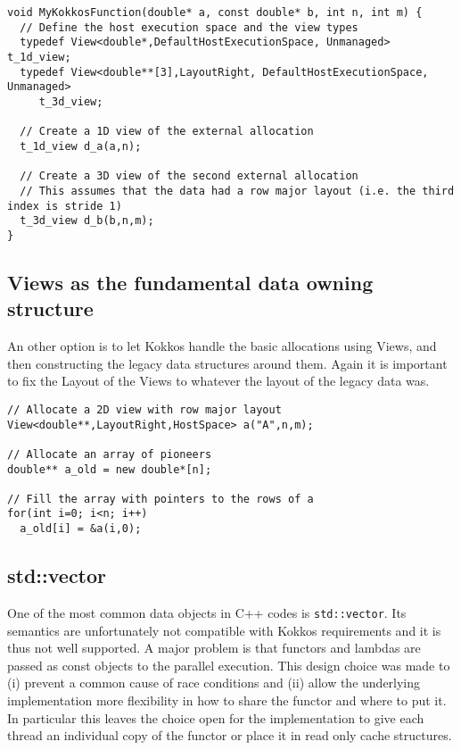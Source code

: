  \begin{lstlisting}
void MyKokkosFunction(double* a, const double* b, int n, int m) {
  // Define the host execution space and the view types
  typedef View<double*,DefaultHostExecutionSpace, Unmanaged> t_1d_view;
  typedef View<double**[3],LayoutRight, DefaultHostExecutionSpace, Unmanaged> 
     t_3d_view;
  
  // Create a 1D view of the external allocation
  t_1d_view d_a(a,n);
 
  // Create a 3D view of the second external allocation
  // This assumes that the data had a row major layout (i.e. the third index is stride 1)
  t_3d_view d_b(b,n,m);
}
\end{lstlisting}

\subsection{Views as the fundamental data owning structure}

An other option is to let Kokkos handle the basic allocations using Views, 
and then constructing the legacy data structures around them. Again it is
important to fix the Layout of the Views to whatever the layout of the legacy 
data was. 

\begin{lstlisting}
// Allocate a 2D view with row major layout
View<double**,LayoutRight,HostSpace> a("A",n,m);

// Allocate an array of pioneers
double** a_old = new double*[n];

// Fill the array with pointers to the rows of a
for(int i=0; i<n; i++)
  a_old[i] = &a(i,0);
\end{lstlisting}

\subsection{std::vector}

One of the most common data objects in C++ codes is \lstinline|std::vector|. 
Its semantics are unfortunately not compatible with Kokkos requirements 
and it is thus not well supported. A major problem is that functors and lambdas
are passed as const objects to the parallel execution. This design choice was made
to (i) prevent a common cause of race conditions and (ii) allow the underlying 
implementation more flexibility in how to share the functor and where to put it.
In particular this leaves the choice open for the implementation to give each thread 
an individual copy of the functor or place it in read only cache structures.

